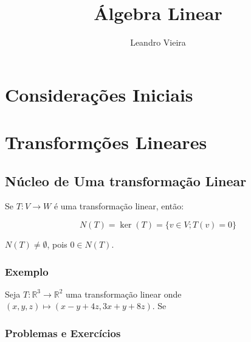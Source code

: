\documentclass[12pt,a4paper]{book}
\author{Leandro Vieira}
\title{Álgebra Linear}
\begin{document}
\maketitle
\tableofcontents

\chapter{Considerações Iniciais}
\chapter{Transformções Lineares}
	\section{Núcleo de Uma transformação Linear}
	
	Se $T : V \longrightarrow W$ é uma transformação linear, então:
	
	$$N(T) = \ker(T) = \lbrace v \in V; T(v) = 0\rbrace$$
	
$N(T) \neq \emptyset$, pois $0 \in N(T)$.

	\subsection{Exemplo}

Seja $ T: {\mathbb{R}}^3  \longrightarrow {\mathbb{R}}^2 $ uma transformação linear onde $(x,y,z)\mapsto(x-y+4z, 3x+y+8z)$. Se
	
	
		\newpage \subsection{Problemas e Exercícios}
		
\end{document}

